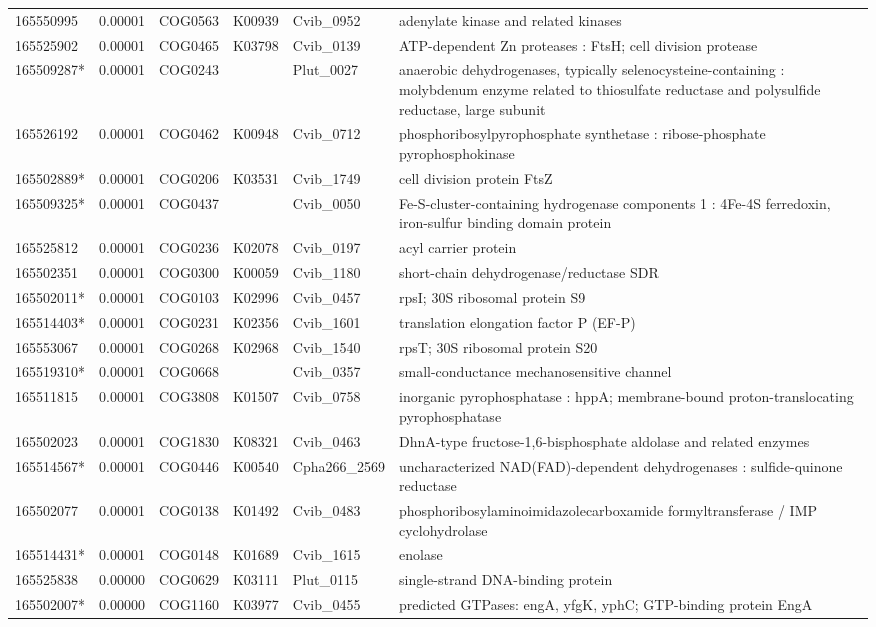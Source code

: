 \begin{landscape}
\begin{longtable}{p{1.8cm}p{0.9cm}p{2.2cm}p{1cm}p{2.8cm}p{13.4cm}}
165550995&0.00001&COG0563&K00939&Cvib\_0952&adenylate kinase and related kinases \\
165525902&0.00001&COG0465&K03798&Cvib\_0139&ATP-dependent Zn proteases : FtsH; cell division protease \\
165509287*&0.00001&COG0243&&Plut\_0027&anaerobic dehydrogenases, typically selenocysteine-containing : molybdenum enzyme related to thiosulfate reductase and polysulfide reductase, large subunit \\
165526192&0.00001&COG0462&K00948&Cvib\_0712&phosphoribosylpyrophosphate synthetase : ribose-phosphate pyrophosphokinase \\
165502889*&0.00001&COG0206&K03531&Cvib\_1749&cell division protein FtsZ \\
165509325*&0.00001&COG0437&&Cvib\_0050&Fe-S-cluster-containing hydrogenase components 1 : 4Fe-4S ferredoxin, iron-sulfur binding domain protein \\
165525812&0.00001&COG0236&K02078&Cvib\_0197&acyl carrier protein \\
165502351&0.00001&COG0300&K00059&Cvib\_1180&short-chain dehydrogenase/reductase SDR \\
165502011*&0.00001&COG0103&K02996&Cvib\_0457&rpsI; 30S ribosomal protein S9 \\
165514403*&0.00001&COG0231&K02356&Cvib\_1601&translation elongation factor P (EF-P) \\
165553067&0.00001&COG0268&K02968&Cvib\_1540&rpsT; 30S ribosomal protein S20 \\
165519310*&0.00001&COG0668&&Cvib\_0357&small-conductance mechanosensitive channel \\
165511815&0.00001&COG3808&K01507&Cvib\_0758&inorganic pyrophosphatase : hppA; membrane-bound proton-translocating pyrophosphatase \\
165502023&0.00001&COG1830&K08321&Cvib\_0463&DhnA-type fructose-1,6-bisphosphate aldolase and related enzymes \\
165514567*&0.00001&COG0446&K00540&Cpha266\_2569&uncharacterized NAD(FAD)-dependent dehydrogenases : sulfide-quinone reductase \\
165502077&0.00001&COG0138&K01492&Cvib\_0483&phosphoribosylaminoimidazolecarboxamide formyltransferase / IMP cyclohydrolase \\
165514431*&0.00001&COG0148&K01689&Cvib\_1615&enolase \\
165525838&0.00000&COG0629&K03111&Plut\_0115&single-strand DNA-binding protein \\
165502007*&0.00000&COG1160&K03977&Cvib\_0455&predicted GTPases: engA, yfgK, yphC; GTP-binding protein EngA \\

\end{longtable}
\end{landscape}

